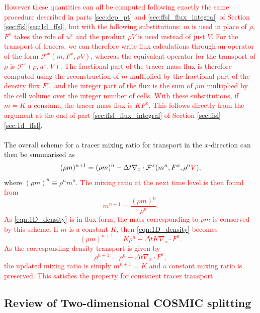 \documentclass{ametsocV6.1}
\newcommand{\change}[1]{\textcolor{red}{#1}}
\begin{document}
\change{However these quantities can all be computed following exactly the same procedure described in parts \ref{sec:dep_pt} and \ref{sec:ffsl_flux_integral} of Section \ref{sec:ffsl}\ref{sec:1d_ffsl}, but with the following substitutions:
$m$ is used in place of $\rho$, $F^x$ takes the role of $u^x$ and the product $\rho V$ is used instead of just $V$.
For the transport of tracers, we can therefore write flux calculations through an operator of the form $\mathcal{F}^x(m,F^x,\rho V)$, whereas the equivalent operator for the transport of $\rho$ is $\mathcal{F}^x(\rho,u^x,V)$.
The fractional part of the tracer mass flux is therefore computed using the reconstruction of $m$ multiplied by the fractional part of the density flux $F^x$, and the integer part of the flux is the sum of $\rho m$ multiplied by the cell volume over the integer number of cells.
With these substitutions, if $m=K$ a constant, the tracer mass flux is $KF^x$. This follows directly from the argument at the end of part \ref{sec:ffsl_flux_integral} of Section \ref{sec:ffsl}\ref{sec:1d_ffsl}.} \\
\\
The overall scheme for a tracer mixing ratio for transport in the $x$-direction can then be summarised as
\begin{equation} \label{eqn:1D_density}
(\rho m)^{n+1} = (\rho m)^n - \Delta t \nabla_x\cdot \mathcal{F}^x(m^n,F^x,\rho^n\change{V}),
\end{equation}
where $(\rho m)^n\equiv \rho^n m^n$.
\change{The mixing ratio at the next time level is then found from
\begin{equation}
m^{n+1} = \frac{(\rho m)^n}{\rho^n}.
\end{equation}
As \eqref{eqn:1D_density} is in flux form, the mass corresponding to $\rho m$ is conserved by this scheme.
If $m$ is a constant $K$, then \eqref{eqn:1D_density} becomes
\begin{equation}
(\rho m)^{n+1} = K\rho^n - \Delta t K \nabla_x\cdot F^x.
\end{equation}
As the corresponding density transport is given by
\begin{equation}
\rho^{n+1} = \rho^n - \Delta t \nabla_x \cdot F^x,
\end{equation}
the updated mixing ratio is simply $m^{n+1}=K$ and a constant mixing ratio is preserved. This satisfies the property for consistent tracer transport.}

\subsection{Review of Two-dimensional COSMIC splitting} \label{sec:cosmic}
\end{document}
